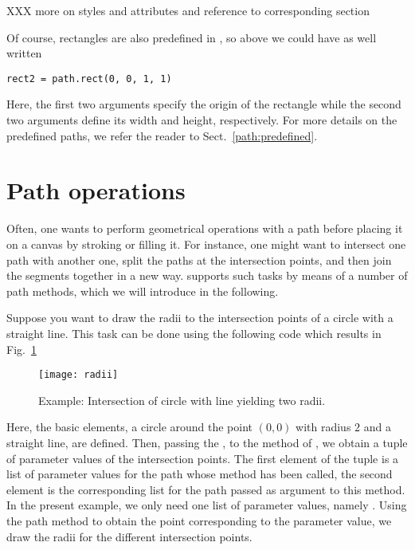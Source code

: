 XXX more on styles and attributes and reference to corresponding section

Of course, rectangles are also predefined in \PyX{}, so above we could
have as well written
\begin{verbatim}
rect2 = path.rect(0, 0, 1, 1)
\end{verbatim}
Here, the first two arguments specify the origin of the rectangle
while the second two arguments define its width and height,
respectively. For more details on the predefined paths, we
refer the reader to Sect.~\ref{path:predefined}.

\section{Path operations}

Often, one wants to perform geometrical operations with a path before
placing it on a canvas by stroking or filling it.  For instance, one
might want to intersect one path with another one, split the paths at
the intersection points, and then join the segments together in a new
way. \PyX{} supports such tasks by means of a number of path methods,
which we will introduce in the following.

Suppose you want to draw the radii to the intersection points of a
circle with a straight line. This task can be done using the following
code which results in Fig.~\ref{fig:radii}

\begin{figure}
\centerline{\texttt{[image: radii]}}
\caption{Example: Intersection of circle with line yielding two radii.}
\label{fig:radii}
\end{figure}
Here, the basic elements, a circle around the point $(0, 0)$ with
radius $2$ and a straight line, are defined. Then, passing the , to
the  method of , we obtain a tuple of
parameter values of the intersection points. The first element of the
tuple is a list of parameter values for the path whose
 method has been called, the second element is the
corresponding list for the path passed as argument to this method. In
the present example, we only need one list of parameter values, namely
.  Using the  path method to obtain
the point corresponding to the parameter value, we draw the radii for
the different intersection points. 

